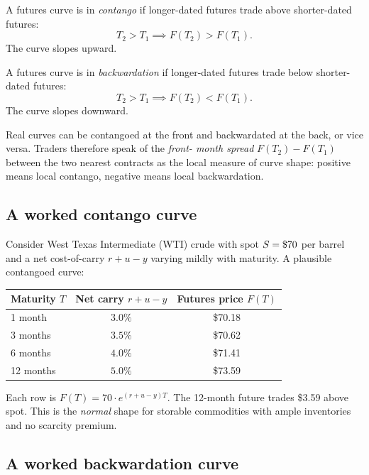 \begin{definition}[Contango]
A futures curve is in \emph{contango} if longer-dated futures trade
above shorter-dated futures:
\[
  T_2 > T_1 \implies F(T_2) > F(T_1).
\]
The curve slopes upward.
\end{definition}

\begin{definition}[Backwardation]
A futures curve is in \emph{backwardation} if longer-dated futures
trade below shorter-dated futures:
\[
  T_2 > T_1 \implies F(T_2) < F(T_1).
\]
The curve slopes downward.
\end{definition}

Real curves can be contangoed at the front and backwardated at the
back, or vice versa.  Traders therefore speak of the \emph{front-
month spread} $F(T_2)-F(T_1)$ between the two nearest contracts as
the local measure of curve shape: positive means local contango,
negative means local backwardation.

\subsection{A worked contango curve}

Consider West Texas Intermediate (WTI) crude with spot $S = \$70$
per barrel and a net cost-of-carry $r + u - y$ varying mildly with
maturity.  A plausible contangoed curve:

\begin{center}
\begin{tabular}{lcc}
\toprule
Maturity $T$ & Net carry $r+u-y$ & Futures price $F(T)$ \\
\midrule
1 month  & $3.0\%$ & \$70.18 \\
3 months & $3.5\%$ & \$70.62 \\
6 months & $4.0\%$ & \$71.41 \\
12 months & $5.0\%$ & \$73.59 \\
\bottomrule
\end{tabular}
\end{center}

Each row is $F(T) = 70 \cdot e^{(r+u-y)T}$.  The 12-month future
trades \$3.59 above spot.  This is the \emph{normal} shape for
storable commodities with ample inventories and no scarcity
premium.

\subsection{A worked backwardation curve}

